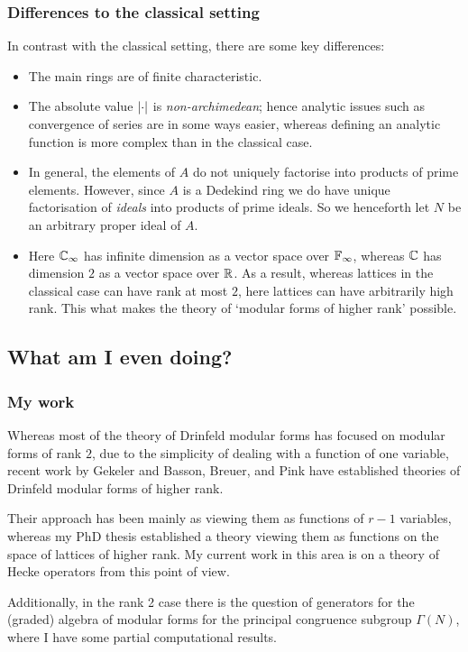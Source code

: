 \begin{frame} \frametitle{Differences to the classical setting}
  In contrast with the classical setting, there are some key differences: \pause
  \begin{itemize}
    \item The main rings are of finite characteristic. \pause
    \item The absolute value $\left\lvert\cdot\right\rvert$ is \emph{non-archimedean}; hence analytic issues such as convergence of series are in some ways easier, whereas defining an analytic function is more complex than in the classical case. \pause
    \item In general, the elements of $A$ do not uniquely factorise into products of prime elements. However, since $A$ is a Dedekind ring we do have unique factorisation of \emph{ideals} into products of prime ideals. \pause So we henceforth let $N$ be an arbitrary proper ideal of $A$.
    \item Here $\mathbb{C}_\infty$ has infinite dimension as a vector space over $\mathbb{F}_\infty$, whereas $\mathbb{C}$ has dimension $2$ as a vector space over $\mathbb{R}$. \pause
    As a result, whereas lattices in the classical case can have rank at most $2$, here lattices can have arbitrarily high rank. This what makes the theory of `modular forms of higher rank' possible.
  \end{itemize}
\end{frame}


\subsection{What am I even doing?}

\begin{frame} \frametitle{My work}
  Whereas most of the theory of Drinfeld modular forms has focused on modular forms of rank $2$, due to the simplicity of dealing with a function of one variable, recent work by Gekeler and Basson, Breuer, and Pink have established theories of Drinfeld modular forms of higher rank. \pause
  
  Their approach has been mainly as viewing them as functions of $r-1$ variables, whereas my PhD thesis established a theory viewing them as functions on the space of lattices of higher rank. \pause
  My current work in this area is on a theory of Hecke operators from this point of view.

  Additionally, in the rank 2 case there is the question of generators for the (graded) algebra of modular forms for the principal congruence subgroup $\Gamma(N)$, where I have some partial computational results.
\end{frame}


